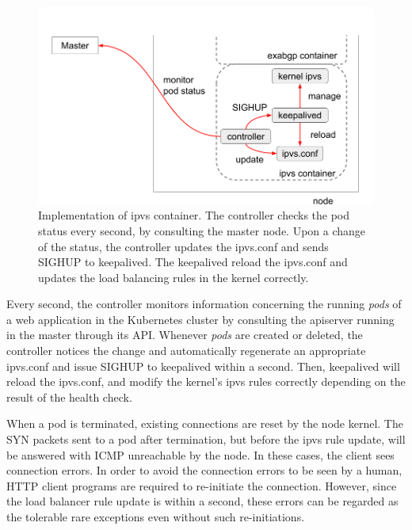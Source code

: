 \begin{figure}[h]
  \centering
  \includegraphics[width=0.8\columnwidth]{Figs/ipvs-ingress-schem}
  
    \par\bigskip
    \centering
    \begin{minipage}{0.9\columnwidth}
      \caption[Implementation of ipvs container]{
        Implementation of ipvs container.
        The controller checks the pod status every second, by consulting the master node.
        Upon a change of the status, the controller updates the ipvs.conf and sends SIGHUP to keepalived.
        The keepalived reload the ipvs.conf and updates the load balancing rules in the kernel correctly.
      }
      \label{fig:ipvs-ingress-schem}
    \end{minipage}
\end{figure}

Every second, the controller monitors information concerning the running {\em pods} of a web application in the Kubernetes cluster by consulting the apiserver running in the master through its API.
Whenever {\em pods} are created or deleted, the controller notices the change and automatically regenerate an appropriate ipvs.conf 
and issue SIGHUP to keepalived within a second.
Then, keepalived will reload the ipvs.conf, and modify the kernel's ipvs rules correctly depending on the result of the health check.

When a pod is terminated, existing connections are reset by the node kernel.
The SYN packets sent to a pod after termination, but before the ipvs rule update, will be answered with ICMP unreachable by the node.
In these cases, the client sees connection errors.
In order to avoid the connection errors to be seen by a human, HTTP client programs are required to re-initiate the connection.
However, since the load balancer rule update is within a second, these errors can be regarded as the tolerable rare exceptions even without such re-initiations.

